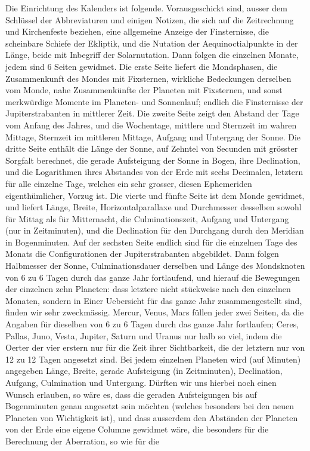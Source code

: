 Die Einrichtung des Kalenders ist folgende. Vorausgeschickt sind, ausser dem Schlüssel der Abbreviaturen und einigen Notizen, die sich auf die Zeitrechnung und Kirchenfeste beziehen, eine allgemeine Anzeige der Finsternisse, die scheinbare Schiefe der Ekliptik, und die Nutation der Aequinoctialpunkte in der Länge, beide mit Inbegriff der Solarnutation. Dann folgen die einzelnen Monate, jedem sind 6 Seiten gewidmet. Die erste Seite liefert die Mondsphasen, die Zusammenkunft des Mondes mit Fixsternen, wirkliche Bedeckungen derselben vom Monde, nahe Zusammenkünfte der Planeten mit Fixsternen, und sonst merkwürdige Momente im Planeten- und Sonnenlauf; endlich die Finsternisse der Jupiterstrabanten in mittlerer Zeit. Die zweite Seite zeigt den Abstand der Tage vom Anfang des Jahres, und die Wochentage, mittlere und Sternzeit im wahren Mittage, Sternzeit im mittleren Mittage, Aufgang und Untergang der Sonne. Die dritte Seite enthält die Länge der Sonne, auf Zehntel von Secunden mit grösster Sorgfalt berechnet, die gerade Aufsteigung der Sonne in Bogen, ihre Declination, und die Logarithmen ihres Abstandes von der Erde mit sechs Decimalen, letztern für alle einzelne Tage, welches ein sehr grosser, diesen Ephemeriden eigenthümlicher, Vorzug ist. Die vierte und fünfte Seite ist dem Monde gewidmet, und liefert Länge, Breite, Horizontalparallaxe und Durchmesser desselben sowohl für Mittag als für Mitternacht, die Culminationszeit, Aufgang und Untergang (nur in Zeitminuten), und die Declination für den Durchgang durch den Meridian in Bogenminuten. Auf der sechsten Seite endlich sind für die einzelnen Tage des Monats die Configurationen der Jupiterstrabanten abgebildet. Dann folgen Halbmesser der Sonne, Culminationsdauer derselben und Länge des Mondsknoten von 6 zu 6 Tagen durch das ganze Jahr fortlaufend, und hierauf die Bewegungen der einzelnen zehn Planeten: dass letztere nicht stückweise nach den einzelnen Monaten, sondern in Einer Uebersicht für das ganze Jahr zusammengestellt sind, finden wir sehr zweckmässig. Mercur, Venus, Mars füllen jeder zwei Seiten, da die Angaben für dieselben von 6 zu 6 Tagen durch das ganze Jahr fortlaufen; Ceres, Pallas, Juno, Vesta, Jupiter, Saturn und Uranus nur halb so viel, indem die Oerter der vier erstern nur für die Zeit ihrer Sichtbarkeit, die der letztern nur von 12 zu 12 Tagen angesetzt sind. Bei jedem einzelnen Planeten wird (auf Minuten) angegeben Länge, Breite, gerade Aufsteigung (in Zeitminuten), Declination, Aufgang, Culmination und Untergang. Dürften wir uns hierbei noch einen Wunsch erlauben, so wäre es, dass die geraden Aufsteigungen bis auf Bogenminuten genau angesetzt sein möchten (welches besonders bei den neuen Planeten von Wichtigkeit ist), und dass ausserdem den Abständen der Planeten von der Erde eine eigene Columne gewidmet wäre, die besonders für die Berechnung der Aberration, so wie für die\par
